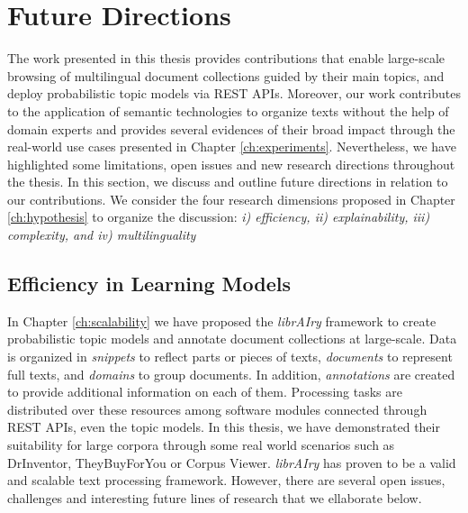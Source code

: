 \section{Future Directions}

The work presented in this thesis provides contributions that enable large-scale browsing of multilingual document collections guided by their main topics, and deploy probabilistic topic models via REST APIs. Moreover, our work contributes to the application of semantic technologies to organize texts without the help of domain experts and provides several evidences of their broad impact through the real-world use cases presented in Chapter \ref{ch:experiments}. Nevertheless, we have highlighted some limitations, open issues and new research directions throughout the thesis. In this section, we discuss and outline future directions in relation to our contributions. We consider the four research dimensions proposed in Chapter \ref{ch:hypothesis} to organize the discussion: \textit{i) efficiency, ii) explainability, iii) complexity, and iv) multilinguality}



\subsection{Efficiency in Learning Models}

In Chapter \ref{ch:scalability} we have proposed the \textit{librAIry} framework to create probabilistic topic models and annotate document collections at large-scale. Data is organized in \textit{snippets} to reflect parts or pieces of texts, \textit{documents} to represent full texts, and \textit{domains} to group documents. In addition, \textit{annotations} are created to provide additional information on each of them. Processing tasks are distributed over these resources among software modules connected through REST APIs, even the topic models. In this thesis, we have demonstrated their suitability for large corpora through some real world scenarios such as DrInventor, TheyBuyForYou or Corpus Viewer. \textit{librAIry} has proven to be a valid and scalable text processing framework. However, there are several open issues, challenges and interesting future lines of research that we ellaborate below.


